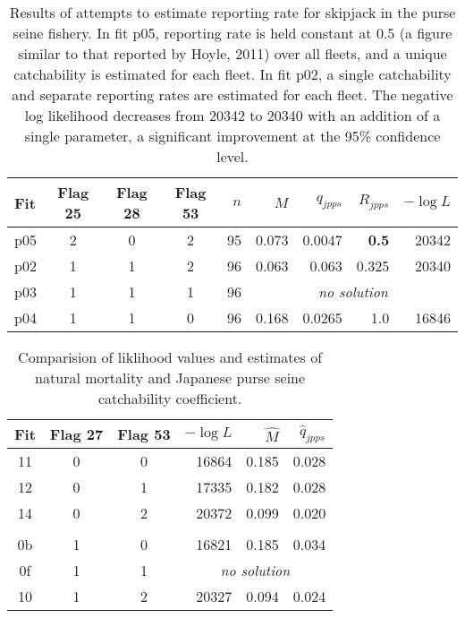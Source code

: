 \begin{table}
\begin{center}
\caption[Reporting rate estimation]
{Results of attempts to estimate reporting rate for skipjack in the
purse seine fishery. 
In fit p05, reporting rate is held constant at
0.5 (a figure similar to that reported by Hoyle, 2011) over all
fleets, and a unique catchability is estimated for each fleet.
In fit p02, a single catchability and separate reporting rates are
estimated for each fleet. The negative log likelihood decreases from
20342 to 20340 with an addition of a single parameter, a significant
improvement at the 95\% confidence level.
}
\label{tab:reporting}
\begin{tabular}{lcccrrrrr}
\hline
Fit & Flag 25 & Flag 28 & Flag 53 & $n$ & $M$ & $q_{jpps}$ & $R_{jpps}$ & $-\log L  $\\ 
\hline
p05 & 2 & 0 & 2 & 95 & 0.073 & 0.0047 & {\bf 0.5} & 20342\\
p02 & 1 & 1 & 2 & 96 & 0.063 & 0.063 & 0.325 & 20340\\
p03 & 1 & 1 & 1 & 96 &\multicolumn{4}{c}{\it no solution}\\
p04 & 1 & 1 & 0 & 96 & 0.168 & 0.0265 & 1.0 & 16846\\
\hline
\end{tabular}
\end{center}
\end{table}

\begin{table}
\caption[Effects of flags 27 and 53]
{Comparision of liklihood values and estimates of natural mortality
and Japanese purse seine catchability coefficient.}
\label{tab:flag2753}
\begin{center}
\begin{tabular}{cccrrr}
\hline
Fit & Flag 27 & Flag 53 & $-\log L$ & $\widehat{M}$ & $\hat{q}_{jpps}$ \\
\hline
 11 & 0 & 0 & 16864 & 0.185 & 0.028 \\
 12 & 0 & 1 & 17335 & 0.182 & 0.028 \\
 14 & 0 & 2 & 20372 & 0.099 & 0.020 \\
\\
 0b & 1 & 0 & 16821 & 0.185 & 0.034 \\
 0f & 1 & 1 & \multicolumn{3}{c}{\it no solution}\\
 10 & 1 & 2 & 20327 & 0.094 & 0.024 \\
\hline
\end{tabular}
\end{center}
\end{table}

